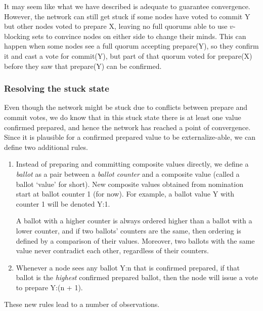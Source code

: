 It may seem like what we have described is adequate to guarantee convergence. However, the network can still get stuck if some nodes have voted to commit Y but other nodes voted to prepare X, leaving no full quorums able to use $v$-blocking sets to convince nodes on either side to change their minds. This can happen when some nodes see a full quorum accepting prepare(Y), so they confirm it and cast a vote for commit(Y), but part of that quorum voted for prepare(X) before they saw that prepare(Y) can be confirmed.

\subsubsection{Resolving the stuck state}

Even though the network might be stuck due to conflicts between prepare and commit votes, we do know that in this stuck state there is at least one value confirmed prepared, and hence the network has reached a point of convergence. Since it is plausible for a confirmed prepared value to be externalize-able, we can define two additional rules.

\begin{enumerate}
    \item Instead of preparing and committing composite values directly, we define a {\em ballot} as a pair between a {\em ballot counter} and a composite value (called a ballot `value' for short). New composite values obtained from nomination start at ballot counter 1 (for now). For example, a ballot value Y with counter 1 will be denoted Y:1.

    A ballot with a higher counter is always ordered higher than a ballot with a lower counter, and if two ballots' counters are the same, then ordering is defined by a comparison of their values. Moreover, two ballots with the same value never contradict each other, regardless of their counters.

    \item Whenever a node sees any ballot Y:n that is confirmed prepared, if that ballot is the {\em highest} confirmed prepared ballot, then the node will issue a vote to prepare Y:(n + 1).
\end{enumerate}

These new rules lead to a number of observations.

